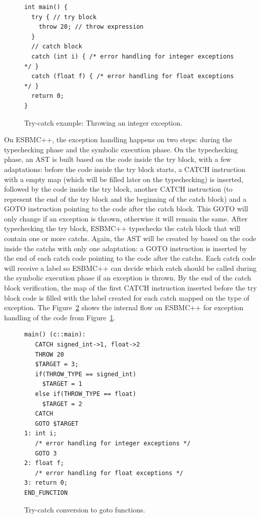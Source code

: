 \documentclass[a4paper]{llncs}
\begin{document}
\begin{figure}[ht]
\centering
\begin{minipage}{1.0\textwidth}
\begin{lstlisting}
int main() {
  try { // try block
    throw 20; // throw expression
  }
  // catch block
  catch (int i) { /* error handling for integer exceptions */ }
  catch (float f) { /* error handling for float exceptions */ }
  return 0;
}
\end{lstlisting}
\end{minipage}
\caption{Try-catch example: Throwing an integer exception.}
\label{figure:try-catch-example}
\end{figure}

On ESBMC++, the exception handling happens on two steps:
during the typechecking phase and the symbolic execution phase.
On the typechecking phase, an AST is built based on the code
inside the try block, with a few adaptations: before the code
inside the try block starts, a CATCH instruction with a empty map
(which will be filled later on the typechecking) is inserted, followed by
the code inside the try block, another CATCH instruction
(to represent the end of the try block and the beginning of the
catch block) and a GOTO instruction pointing to the code after
the catch block. This GOTO will only change if an exception is thrown,
otherwise it will remain the same. After typechecking the try block,
ESBMC++ typechecks the catch block that will contain one or more catchs.
Again, the AST will be created by based on the code inside the catchs
with only one adaptation: a GOTO instruction is inserted by the end of
each catch code pointing to the code after the catchs. Each catch code
will receive a label so ESBMC++ can decide which catch should be called
during the symbolic execution phase if an exception is thrown. By the end
of the catch block verification, the map of the first CATCH instruction
inserted before the try block code is filled with the label created
for each catch mapped on the type of exception. The Figure~\ref{figure:try-catch-goto}
shows the internal flow on ESBMC++ for exception handling of the code from
Figure~\ref{figure:try-catch-example}.

\begin{figure}[ht]
\centering
\begin{minipage}{1.0\textwidth}
\begin{lstlisting}
main() (c::main):
   CATCH signed_int->1, float->2
   THROW 20
   $TARGET = 3;
   if(THROW_TYPE == signed_int)
     $TARGET = 1
   else if(THROW_TYPE == float)
     $TARGET = 2
   CATCH
   GOTO $TARGET
1: int i;
   /* error handling for integer exceptions */
   GOTO 3
2: float f;
   /* error handling for float exceptions */
3: return 0;
END_FUNCTION
\end{lstlisting}
\end{minipage}
\caption{Try-catch conversion to goto functions.}
\label{figure:try-catch-goto}
\end{figure}
\end{document}
